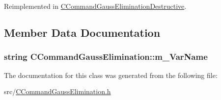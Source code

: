 Reimplemented in \hyperlink{classCCommandGaussEliminationDestructive_a6bb98f06cdb90b5dbe129286d7d08cc7}{C\+Command\+Gauss\+Elimination\+Destructive}.



\subsection{Member Data Documentation}
\subsubsection[{\texorpdfstring{m\+\_\+\+Var\+Name}{m_VarName}}]{\setlength{\rightskip}{0pt plus 5cm}string C\+Command\+Gauss\+Elimination\+::m\+\_\+\+Var\+Name\hspace{0.3cm}{\ttfamily [protected]}}\hypertarget{classCCommandGaussElimination_a2e619e3d9fb79bca7076ab72c21c09b4}{}\label{classCCommandGaussElimination_a2e619e3d9fb79bca7076ab72c21c09b4}


The documentation for this class was generated from the following file\+:\begin{DoxyCompactItemize}
\item 
src/\hyperlink{CCommandGaussElimination_8h}{C\+Command\+Gauss\+Elimination.\+h}\end{DoxyCompactItemize}
